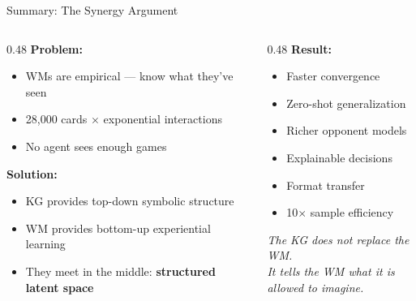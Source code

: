 \documentclass[aspectratio=169, 11pt]{beamer}
\begin{document}
\begin{frame}{Summary: The Synergy Argument}
  \begin{columns}[T]
    \begin{column}{0.48\textwidth}
      \textbf{Problem:}
      \begin{itemize}\small
        \item WMs are empirical --- know what they've seen
        \item 28,000 cards $\times$ exponential interactions
        \item No agent sees enough games
      \end{itemize}
      \vspace{0.3cm}
      \textbf{Solution:}
      \begin{itemize}\small
        \item KG provides top-down symbolic structure
        \item WM provides bottom-up experiential learning
        \item They meet in the middle: \textbf{structured latent space}
      \end{itemize}
    \end{column}
    \begin{column}{0.48\textwidth}
      \textbf{Result:}
      \begin{itemize}\small
        \item[\checkmark] Faster convergence
        \item[\checkmark] Zero-shot generalization
        \item[\checkmark] Richer opponent models
        \item[\checkmark] Explainable decisions
        \item[\checkmark] Format transfer
        \item[\checkmark] 10$\times$ sample efficiency
      \end{itemize}
      \vspace{0.3cm}
      \begin{center}
        \textit{The KG does not replace the WM.\\
        It tells the WM what it is\\allowed to imagine.}
      \end{center}
    \end{column}
  \end{columns}
\end{frame}
\end{document}
